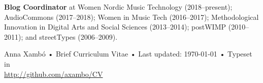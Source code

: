 \documentclass[10pt, a4paper]{article}
\begin{document}
{\textbf{Blog Coordinator}} at Women Nordic Music Technology (2018--present); AudioCommons (2017--2018); Women in Music Tech (2016--2017); Methodological Innovation in Digital Arts and Social Sciences (2013--2014); postWIMP (2010--2011); and streetTypes (2006--2009).\\


\begin{center}
{\scriptsize  Anna Xambó •\- Brief Curriculum Vitae •\- Last updated: \today\- •\- %
Typeset in \href{http://nitens.org/taraborelli/cvtex}{
\XeTeX }\\
\href{http://github.com/axambo/CV}{http://github.com/axambo/CV}}
\end{center}
\end{document}
